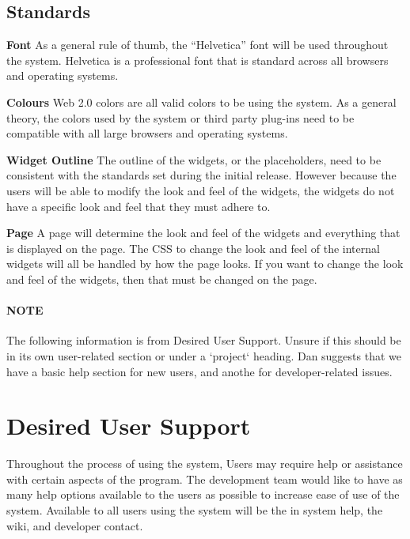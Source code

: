 \documentclass[letterpaper,12pt]{report}
\begin{document}
\subsection{Standards}
\begin{description}
 \item \textbf{Font} \newline As a general rule of thumb, the “Helvetica” font will be used throughout the system. Helvetica is a professional font that is standard across all browsers and operating systems.
 \item \textbf{Colours} \newline Web 2.0 colors are all valid colors to be using the system. As a general theory, the colors used by the system or third party plug-ins need to be compatible with all large browsers and operating systems.
 \item \textbf{Widget Outline} \newline The outline of the widgets, or the placeholders, need to be consistent with the standards set during the initial release. However because the users will be able to modify the look and feel of the widgets, the widgets do not have a specific look and feel that they must adhere to. 
 \item \textbf{Page} \newline A page will determine the look and feel of the widgets and everything that is displayed on the page. The CSS to change the look and feel of the internal widgets will all be handled by how the page looks. If you want to change the look and feel of the widgets, then that must be changed on the page.

 \end{description}

\paragraph{NOTE}The following information is from Desired User Support. Unsure if this should be in its own user-related section or under a `project` heading. Dan suggests that we have a basic help section for new users, and anothe for developer-related issues.

\pagebreak
\section{Desired User Support}
Throughout the process of using the system, Users may require help or assistance with certain aspects of the program. The development team would like to have as many help options available to the users as possible to increase ease of use of the system. Available to all users using the system will be the in system help, the wiki, and developer contact. 
\end{document}
